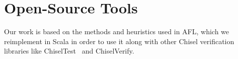 \documentclass[conference]{IEEEtran}
\begin{document}
%
%



\section{Open-Source Tools}
\label{sec:tools}

Our work is based on the methods and heuristics used in AFL, which we reimplement in Scala in order to use it along with other Chisel verification libraries like ChiselTest~\cite{chisel:tester2} and ChiselVerify.
\end{document}
